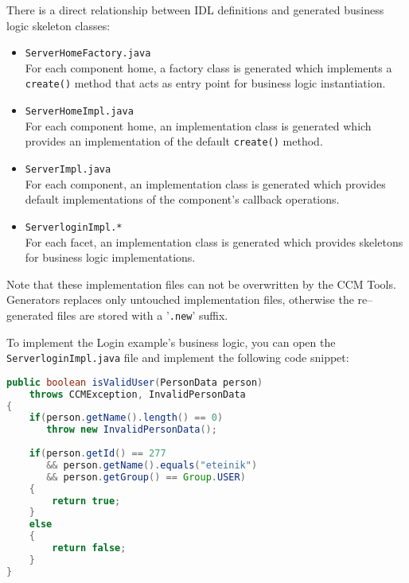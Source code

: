 \vspace{3mm}
There is a direct relationship between IDL definitions and generated business
logic skeleton classes:
\begin{itemize}
	\item {\tt ServerHomeFactory.java} \\
	For each component home, a factory class is generated which implements a {\tt create()}
	method that acts as entry point for business logic instantiation.
		  
	\item {\tt ServerHomeImpl.java}\\
	For each component home, an implementation class is generated which provides an
	implementation of the default {\tt create()} method.

\item {\tt ServerImpl.java}\\
	For each component, an implementation class is generated which provides 
	default implementations of the component's callback operations.
	
\item {\tt ServerloginImpl.*}\\
	For each facet, an implementation class is generated which provides
	skeletons for business logic implementations.
\end{itemize}

\vspace{3mm}
Note that these implementation files can not be overwritten by the CCM Tools.
Generators replaces only untouched implementation files, otherwise the 
re--generated files are stored with a '{\tt .new}' suffix.

\vspace{3mm}
To implement the Login example's business logic, you can open the 
{\tt ServerloginImpl.java} file and implement the following code snippet:
\begin{footnotesize}
\begin{lstlisting}[language=Java]
public boolean isValidUser(PersonData person)
    throws CCMException, InvalidPersonData
{
    if(person.getName().length() == 0)
       throw new InvalidPersonData();
        
    if(person.getId() == 277
       && person.getName().equals("eteinik")
       && person.getGroup() == Group.USER)
    {
        return true;
    }
    else
    {
        return false;
    }
}    
\end{lstlisting}
\end{footnotesize}

